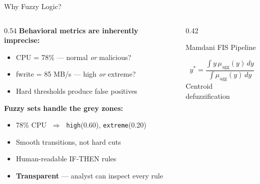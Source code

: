 \documentclass[aspectratio=169,12pt]{beamer}
\begin{document}
\begin{frame}{Why Fuzzy Logic?}
  \begin{columns}[T]
    \begin{column}{0.54\textwidth}
      \textbf{Behavioral metrics are inherently imprecise:}
      \begin{itemize}\small
        \item CPU = 78\% \;—\; normal \emph{or} malicious?
        \item fwrite = 85 MB/s \;—\; high \emph{or} extreme?
        \item Hard thresholds produce false positives
      \end{itemize}
      \vspace{0.5em}
      \textbf{Fuzzy sets handle the grey zones:}
      \begin{itemize}\small
        \item 78\% CPU $\;\Rightarrow\;$
              \texttt{high}(0.60), \texttt{extreme}(0.20)
        \item Smooth transitions, not hard cuts
        \item Human-readable IF-THEN rules
        \item \textbf{Transparent} — analyst can inspect every rule
      \end{itemize}
    \end{column}
    \begin{column}{0.42\textwidth}
      \begin{block}{Mamdani FIS Pipeline}
        \centering\vspace{0.3em}
        \vspace{0.4em}
        \[
          y^* = \frac{\displaystyle\int y\,\mu_{\text{agg}}(y)\,dy}
                     {\displaystyle\int \mu_{\text{agg}}(y)\,dy}
        \]
        \vspace{0.1em}
        \footnotesize Centroid defuzzification
      \end{block}
    \end{column}
  \end{columns}
\end{frame}
\end{document}
